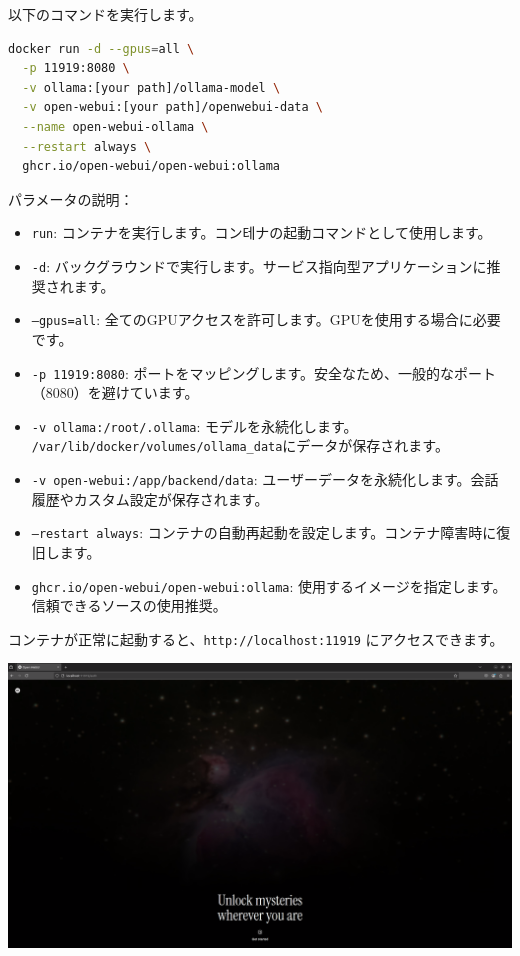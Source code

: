 以下のコマンドを実行します。
\begin{lstlisting}[language=bash]
docker run -d --gpus=all \
  -p 11919:8080 \
  -v ollama:[your path]/ollama-model \
  -v open-webui:[your path]/openwebui-data \
  --name open-webui-ollama \
  --restart always \
  ghcr.io/open-webui/open-webui:ollama
\end{lstlisting}

パラメータの説明：
\begin{itemize}
  \item \texttt{run}: コンテナを実行します。コン테ナの起動コマンドとして使用します。
  
  \item \texttt{-d}: バックグラウンドで実行します。サービス指向型アプリケーションに推奨されます。
  
  \item \texttt{--gpus=all}: 全てのGPUアクセスを許可します。GPUを使用する場合に必要です。
  
  \item \texttt{-p 11919:8080}: ポートをマッピングします。安全なため、一般的なポート（8080）を避けています。
  
  \item \texttt{-v ollama:/root/.ollama}: モデルを永続化します。\\ \texttt{/var/lib/docker/volumes/ollama\_data}にデータが保存されます。
  
  \item \texttt{-v open-webui:/app/backend/data}: ユーザーデータを永続化します。会話履歴やカスタム設定が保存されます。
  
  \item \texttt{--restart always}: コンテナの自動再起動を設定します。コンテナ障害時に復旧します。
  
  \item \texttt{ghcr.io/open-webui/open-webui:ollama}: 使用するイメージを指定します。信頼できるソースの使用推奨。
\end{itemize}

コンテナが正常に起動すると、\texttt{http://localhost:11919} にアクセスできます。

\includegraphics[width=0.8\linewidth]{images/Pasted image 20250304171521.png}


